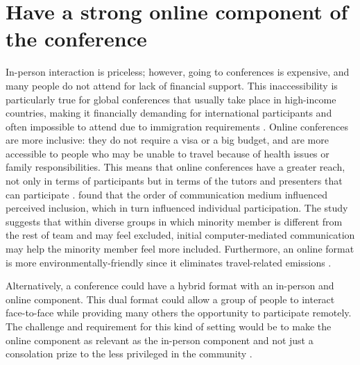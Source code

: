 \documentclass[10pt,letterpaper]{article}
\begin{document}
\section{Have a strong online component of the conference} 
\label{rule_online}

In-person interaction is priceless; however, going to conferences is expensive, and many people do not attend for lack of financial support. This inaccessibility %
is particularly true for global conferences that usually take place in high-income countries, making it financially demanding for international participants and often impossible to attend due to immigration requirements \cite{arendDisparityConferenceRegistration2019,gewinWhatScientistsShould2019}. Online conferences are more inclusive: they do not require a visa or a big budget, and are more accessible to people who may be unable to travel because of health issues or family responsibilities. This means that online conferences have a greater reach, not only in terms of participants but in terms of the tutors and presenters that can participate \cite{atkinsonJournalMedicine20202021}. \cite{https://link.springer.com/content/pdf/10.1007/s10869-011-9232-7.pdf} found that the order of communication medium influenced perceived inclusion, which in turn influenced individual participation.  The study suggests that within diverse groups in which minority member is different from the rest of team and may feel excluded, initial computer-mediated communication may help the minority member feel more included. Furthermore, an online format is more environmentally-friendly since it eliminates travel-related emissions \cite{sarabipourChangingScientificMeetings2021,ninerBetterWhomLeveling2021, gattrellComparisonCarbonCosts2021}.


Alternatively, a conference could have a hybrid format with an in-person and online component. This dual format could allow a group of people to interact face-to-face while providing many others the opportunity to participate remotely. The challenge and requirement for this kind of setting would be to make the online component as relevant as the in-person component and not just a consolation prize to the less privileged in the community \cite{ninerBetterWhomLeveling2021}. %
\end{document}
